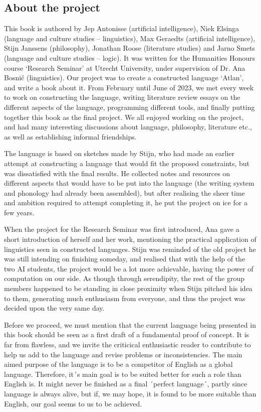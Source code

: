 \subsection{About the project}

This book is authored by Jep Antonisse (artificial intelligence), Niek Elsinga (language and culture studies – linguistics), Max Geraedts (artificial intelligence), Stijn Janssens (philosophy), Jonathan Roose (literature studies) and Jarno Smets (language and culture studies – logic). It was written for the Humanities Honours course ‘Research Seminar’ at Utrecht University, under supervision of Dr. Ana Bosnić (linguistics). Our project was to create a constructed language ‘Atlan’, and write a book about it. From February until June of 2023, we met every week to work on constructing the language, writing literature review essays on the different aspects of the language, programming different tools, and finally putting together this book as the final project. We all enjoyed working on the project, and had many interesting discussions about language, philosophy, literature etc., as well as establishing informal friendships. 

The language is based on sketches made by Stijn, who had made an earlier attempt at constructing a language that would fit the proposed constraints, but was dissatisfied with the final results. He collected notes and resources on different aspects that would have to be put into the language (the writing system and phonology had already been assembled), but after realising the sheer time and ambition required to attempt completing it, he put the project on ice for a few years.  

When the project for the Research Seminar was first introduced, Ana gave a short introduction of herself and her work, mentioning the practical application of linguistics seen in constructed languages. Stijn was reminded of the old project he was still intending on finishing someday, and realised that with the help of the two AI students, the project would be a lot more achievable, having the power of computation on our side. As though through serendipity, the rest of the group members happened to be standing in close proximity when Stijn pitched his idea to them, generating much enthusiasm from everyone, and thus the project was decided upon the very same day.  

Before
we proceed, we must mention that the current language being presented in this
book should be seen as a first draft of a fundamental proof of concept. It is
far from flawless, and we invite the criticical enthusiastic reader to
contribute to help us add to the language and revise problems or
inconsistencies. The main aimed purpose of the language is to be a competitor
of English as a global language. Therefore, it´s main goal is to be suited
better for such a role than English is. It might never be finished as a final ´perfect
language´, partly since language is always alive, but if, we may hope, it is
found to be more suitable than English, our goal seems to us to be achieved.

